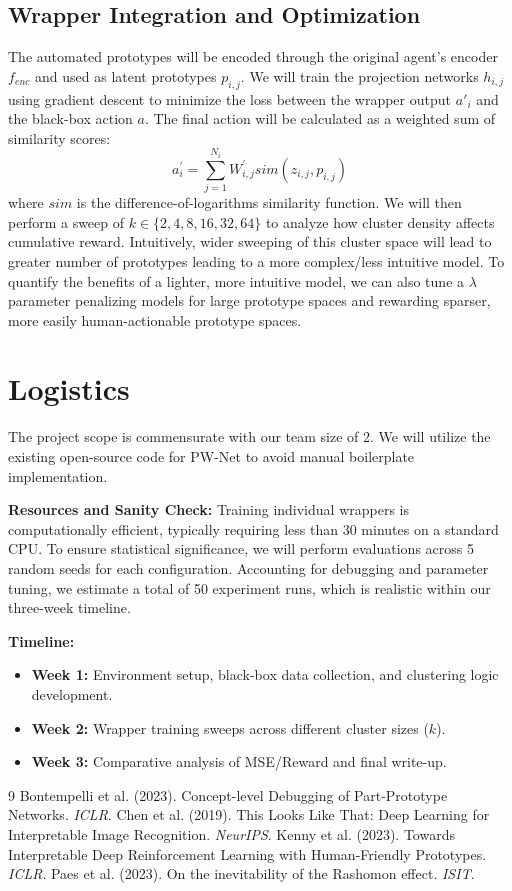 \documentclass{article} %
\begin{document}
\subsection{Wrapper Integration and Optimization}
The automated prototypes will be encoded through the original agent's encoder $f_{enc}$ and used as latent prototypes $p_{i,j}$. We will train the projection networks $h_{i,j}$ using gradient descent to minimize the loss between the wrapper output $a'_i$ and the black-box action $a$. The final action will be calculated as a weighted sum of similarity scores:
\begin{equation}
    a_{i}^{\prime}=\sum_{j=1}^{N_{i}}W_{i,j}^{\prime}sim(z_{i,j},p_{i,j})
\end{equation}
where $sim$ is the difference-of-logarithms similarity function. We will then perform a sweep of $k \in \{2, 4, 8, 16, 32, 64\}$ to analyze how cluster density affects cumulative reward. Intuitively, wider sweeping of this cluster space will lead to greater number of prototypes leading to a more complex/less intuitive model. To quantify the benefits of a lighter, more intuitive model, we can also tune a $\lambda$ parameter penalizing models for large prototype spaces and rewarding sparser, more easily human-actionable prototype spaces. 

\section{Logistics}
The project scope is commensurate with our team size of 2. We will utilize the existing open-source code for PW-Net to avoid manual boilerplate implementation. 

\textbf{Resources and Sanity Check:}
Training individual wrappers is computationally efficient, typically requiring less than 30 minutes on a standard CPU. To ensure statistical significance, we will perform evaluations across 5 random seeds for each configuration. Accounting for debugging and parameter tuning, we estimate a total of 50 experiment runs, which is realistic within our three-week timeline.

\textbf{Timeline:}
\begin{itemize}
    \item \textbf{Week 1:} Environment setup, black-box data collection, and clustering logic development.
    \item \textbf{Week 2:} Wrapper training sweeps across different cluster sizes ($k$).
    \item \textbf{Week 3:} Comparative analysis of MSE/Reward and final write-up.
\end{itemize}

\begin{thebibliography}{9}
 Bontempelli et al. (2023). Concept-level Debugging of Part-Prototype Networks. \textit{ICLR}.
 Chen et al. (2019). This Looks Like That: Deep Learning for Interpretable Image Recognition. \textit{NeurIPS}.
 Kenny et al. (2023). Towards Interpretable Deep Reinforcement Learning with Human-Friendly Prototypes. \textit{ICLR}.
 Paes et al. (2023). On
the inevitability of the Rashomon effect. \textit{ISIT}.
\end{thebibliography}
\end{document}
